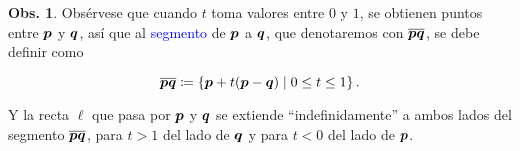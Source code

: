 \documentclass{article}
\theoremstyle{definicion}
\theoremstyle{definition}             %
\theoremstyle{definition}             %
\theoremstyle{definition}
\theoremstyle{definition}
\theoremstyle{observacion}
\newtheorem{obs}{Obs.}
\theoremstyle{definition}
\theoremstyle{plain}
\theoremstyle{definition}
\theoremstyle{afirmacion}
\theoremstyle{notation}
\theoremstyle{definition}
\begin{document}
    \begin{obs}
        Obsérvese que cuando \(t\) toma valores entre \(0\) y \(1\), se obtienen puntos entre \(\vb*{p}\) y \(\vb*{q}\), así que al \textcolor{blue}{segmento} de \(\vb*{p}\) a \(\vb*{q}\), que denotaremos con \(\overline{\vb*{p}\vb*{q}}\), se debe definir como

        \begin{equation*}
            \overline{\vb*{p}\vb*{q}} \coloneq \left\lbrace \vb*{p} + t(\vb*{p} - \vb*{q}) \mid 0 \leq t \leq 1\right\rbrace.
        \end{equation*}

        Y la recta \(\ell\) que pasa por \(\vb*{p}\) y \(\vb*{q}\) se extiende ``indefinidamente'' a ambos lados del segmento \(\overline{\vb*{p}\vb*{q}}\), para \(t > 1\) del lado de \(\vb*{q}\) y para \(t < 0\) del lado de \(\vb*{p}\).
    \end{obs}
\end{document}
